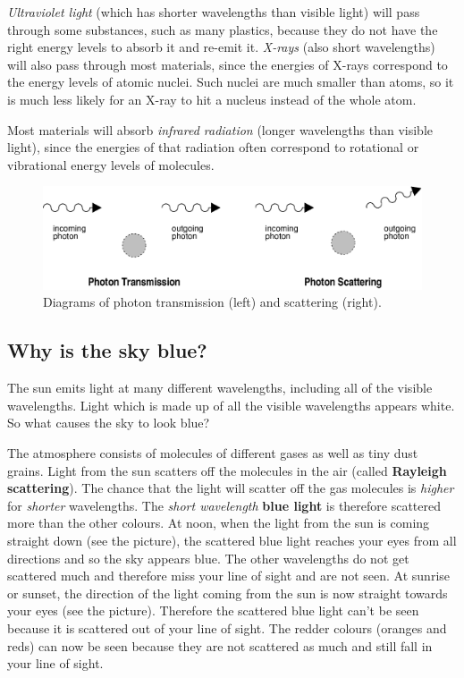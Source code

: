 \textit{Ultraviolet light} (which has shorter wavelengths than visible light) will pass through some substances, such as many plastics, because they do not have the right energy levels to absorb it and re-emit it. \textit{X-rays} (also short wavelengths) will also pass through most materials, since the energies of X-rays correspond to the energy levels of atomic nuclei.  Such nuclei are much smaller than atoms, so it is much less likely for an X-ray to hit a nucleus instead of the whole atom.

Most materials will absorb \textit{infrared radiation} (longer wavelengths than visible light), since the energies of that radiation often correspond to rotational or vibrational energy levels of molecules. 

\begin{figure}[!tb]
\begin{center}
\includegraphics[width=4.5in]{../../epsimages/photon_scatter_transmission.eps}
\end{center}
\caption{Diagrams of photon transmission (left) and scattering (right).}
\label{transscatter}
\end{figure}

 
\subsection{Why is the sky blue?}
The sun emits light at many different wavelengths, including all of the visible wavelengths. Light which is made up of all the visible wavelengths appears white. So what causes the sky to look blue?

The atmosphere consists of molecules of different gases as well as tiny dust grains. Light from the sun scatters off the molecules in the air (called \textbf{Rayleigh scattering}).  
The chance that the light will scatter off the gas molecules is \textit{higher} for \textit{shorter} wavelengths.  The \textit{short wavelength} \textbf{blue light} is therefore scattered more than the other colours.  At noon, when the light from the sun is coming straight down (see the picture), the scattered blue light reaches your eyes from all directions and so the sky appears blue. The other wavelengths do not get scattered much and therefore miss your line of sight and are not seen. At sunrise or sunset, the direction of the light coming from the sun is now straight towards your eyes (see the picture). Therefore the scattered blue light can't be seen because it is scattered out of your line of sight. The redder colours (oranges and reds) can now be seen because they are not scattered as much and still fall in your line of sight. 
 



